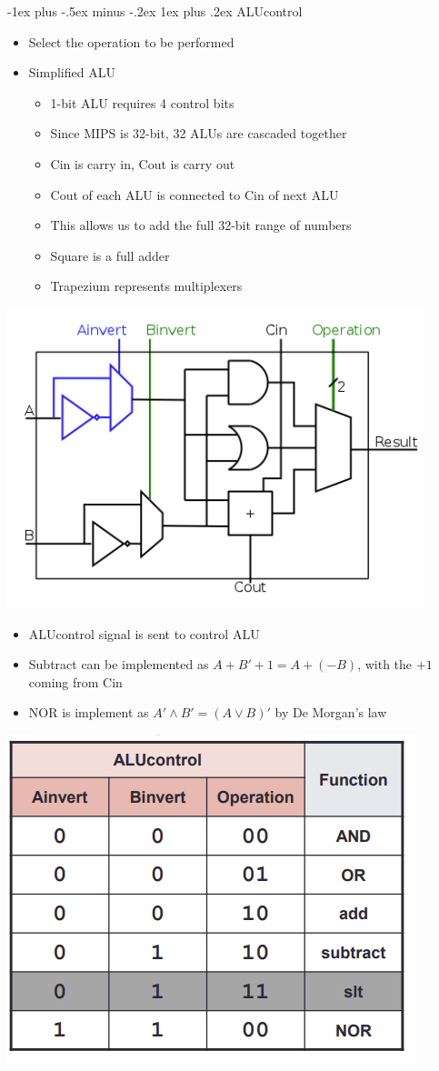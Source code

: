 \documentclass[10pt, portrait]{article}
\makeatletter
\renewcommand{\subsection}{\@startsection{subsection}{3}{0mm}%
                                {-1ex plus -.5ex minus -.2ex}%
                                {1ex plus .2ex}%
                                {\normalfont\small\bfseries}}%
\makeatother
\begin{document}
\begin{multicols*}{2}
\subsection{ALUcontrol}
\begin{itemize}
    \item Select the operation to be performed
    \item Simplified ALU
    \begin{itemize}
        \item 1-bit ALU requires 4 control bits
        \item Since MIPS is 32-bit, 32 ALUs are cascaded together
        \item Cin is carry in, Cout is carry out
        \item Cout of each ALU is connected to Cin of next ALU
        \item This allows us to add the full 32-bit range of numbers
        \item Square is a full adder
        \item Trapezium represents multiplexers
    \end{itemize}
\end{itemize}
\begin{center}
    \includegraphics[width=0.7\linewidth]{alu gates.png}
\end{center}
\begin{itemize}
    \item ALUcontrol signal is sent to control ALU
    \item Subtract can be implemented as $A + B' + 1 = A + (-B)$, with the $+ 1$ coming from Cin
    \item NOR is implement as $A' \land B' = (A \lor B)'$ by De Morgan's law
\end{itemize}
\begin{center}
    \includegraphics[width=0.7\linewidth]{alu control.png}

\end{center}
\end{multicols*}
\end{document}
